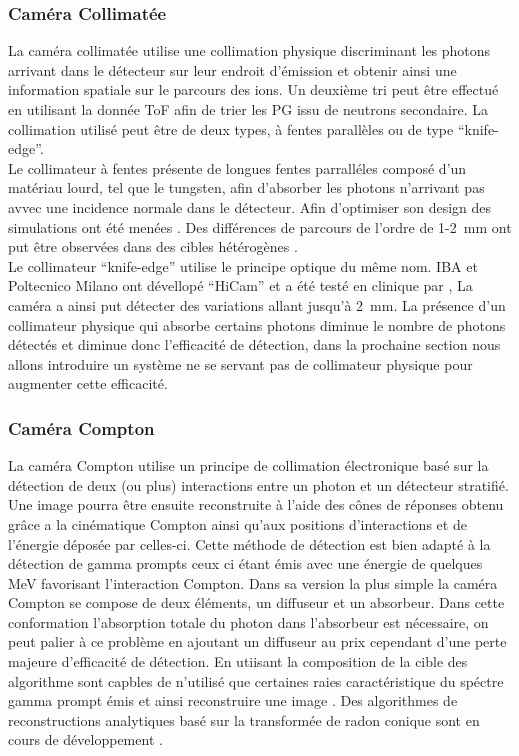 \documentclass[11pt,a4paper,oldfontcommands]{memoir}
\begin{document}
\subsubsection{Caméra Collimatée}
La caméra collimatée utilise une collimation physique discriminant les photons arrivant dans le détecteur sur leur endroit d'émission et obtenir ainsi une information spatiale sur le parcours des ions. Un deuxième tri peut être effectué en utilisant la donnée ToF afin de trier les PG issu de neutrons secondaire. La collimation utilisé peut être de deux types, à fentes parallèles ou de type \enquote{knife-edge}.\\
Le collimateur à fentes présente de longues fentes parralléles composé d'un matériau lourd, tel que le tungsten, afin d'absorber les photons n'arrivant pas avvec une incidence normale dans le détecteur. Afin d'optimiser son design des simulations ont été menées \cite{Pinto_2014}\cite{MinSimu}. Des différences de parcours de l'ordre de 1-2~mm ont put être observées dans des cibles hétérogènes \cite{PintoCollimated}.\\
Le collimateur \enquote{knife-edge} utilise le principe optique du même nom. IBA et Poltecnico Milano ont dévellopé \enquote{HiCam} \cite{Smeets_2012} et a été testé en clinique par \cite{Richter2016}, La caméra a ainsi put détecter des variations allant jusqu'à 2~mm. La présence d'un collimateur physique qui absorbe certains photons diminue le nombre de photons détectés et diminue donc l’efficacité de détection, dans la prochaine section nous allons introduire un système ne se servant pas de collimateur physique pour  augmenter cette efficacité.  

\subsubsection{Caméra Compton}
La caméra Compton utilise un principe de collimation électronique basé sur la détection de deux (ou plus) interactions entre un photon et un détecteur stratifié. Une image pourra être ensuite reconstruite à l'aide des cônes de réponses obtenu grâce a la cinématique Compton ainsi qu'aux positions d’interactions et de l'énergie déposée par celles-ci. Cette méthode de détection est bien adapté à la détection de gamma prompts ceux ci étant émis avec une énergie de quelques MeV favorisant l'interaction Compton. Dans sa version la plus simple la caméra Compton se compose de deux éléments, un diffuseur et un absorbeur. Dans cette conformation l'absorption totale du photon dans l'absorbeur est nécessaire, on peut palier à ce problème en ajoutant un diffuseur au prix cependant d'une perte majeure d'efficacité de détection. En utiisant la composition de la cible des algorithme sont capbles de n'utilisé que certaines raies caractéristique du spéctre gamma prompt émis et ainsi reconstruire une image \cite{Draeger_2016}. Des algorithmes de reconstructions analytiques basé sur la transformée de radon conique sont en cours de développement \cite{Maxim_2018}.
\end{document}
